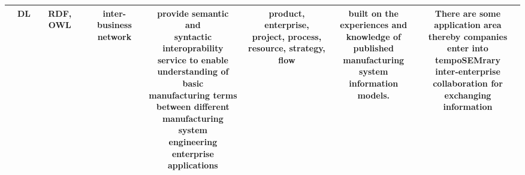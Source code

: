 \begin{landscape}
\begin{table}[ht!]
\begin{center}
\begin{adjustwidth}{}{}
\begin{tabular}{ c | c | c | c | c | c | c | c  }
				\tiny \textit{\makecell{MSE ontology\cite{Lin}}} & \tiny DL & \tiny RDF, OWL & \tiny \makecell[l]{inter-business\\ network} & \tiny \makecell[l]{provide semantic and\\ syntactic interoprability\\ service to enable\\ understanding of basic\\ manufacturing terms \\between different \\manufacturing system\\ engineering enterprise \\applications} & \tiny \makecell[l]{product, enterprise,\\ project, process,\\ resource, strategy, flow} & \tiny \makecell[l]{built on the\\ experiences and\\ knowledge of \\published\\ manufacturing\\ system information\\ models.}    	
				& \tiny \makecell[l]{There are some \\application area\\ thereby companies\\ enter into tempoSEMrary\\ inter-enterprise\\ collaboration for\\ exchanging information} \\
				
				\hline
				

\end{tabular}
\end{adjustwidth}
\end{center}
\end{table}
\end{landscape}
